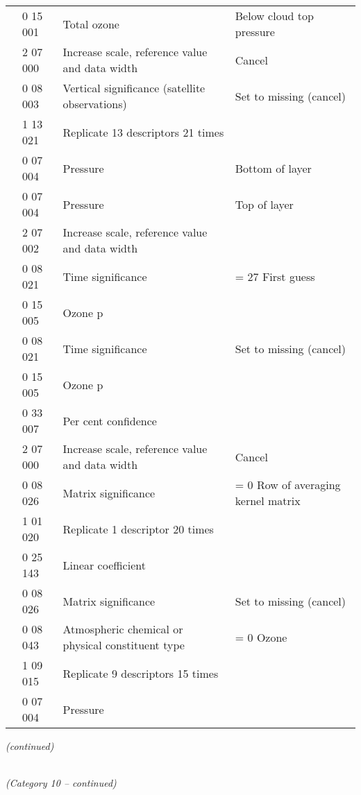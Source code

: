 \begin{longtable}[]{@{}llll@{}}
& 0 15 001 & Total ozone & Below cloud top pressure\tabularnewline
& 2 07 000 & Increase scale, reference value and data width & Cancel\tabularnewline
& 0 08 003 & Vertical significance (satellite observations) & Set to missing (cancel)\tabularnewline
& 1 13 021 & Replicate 13 descriptors 21 times &\tabularnewline
& 0 07 004 & Pressure & Bottom of layer\tabularnewline
& 0 07 004 & Pressure & Top of layer\tabularnewline
& 2 07 002 & Increase scale, reference value and data width &\tabularnewline
& 0 08 021 & Time significance & = 27 First guess\tabularnewline
& 0 15 005 & Ozone p &\tabularnewline
& 0 08 021 & Time significance & Set to missing (cancel)\tabularnewline
& 0 15 005 & Ozone p &\tabularnewline
& 0 33 007 & Per cent confidence &\tabularnewline
& 2 07 000 & Increase scale, reference value and data width & Cancel\tabularnewline
& 0 08 026 & Matrix significance & = 0 Row of averaging kernel matrix\tabularnewline
& 1 01 020 & Replicate 1 descriptor 20 times &\tabularnewline
& 0 25 143 & Linear coefficient &\tabularnewline
& 0 08 026 & Matrix significance & Set to missing (cancel)\tabularnewline
& 0 08 043 & Atmospheric chemical or physical constituent type & = 0 Ozone\tabularnewline
& 1 09 015 & Replicate 9 descriptors 15 times &\tabularnewline
& 0 07 004 & Pressure &\tabularnewline
\bottomrule
\end{longtable}

\emph{(continued)}

\emph{\\
(Category 10 -- continued)}

